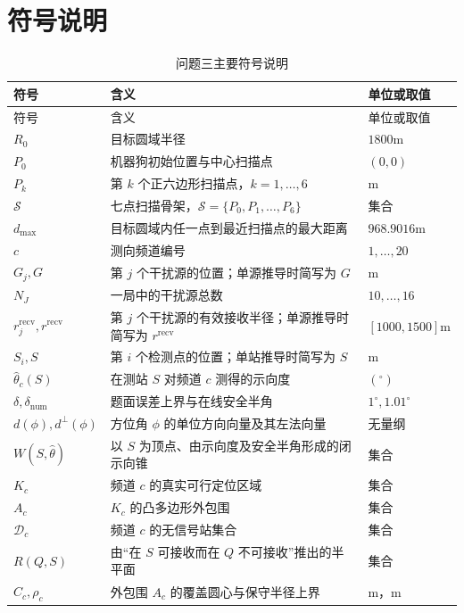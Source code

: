 \section{符号说明}

\begin{longtable}{@{}>{\small}p{}>{\small}p{}>{\small}p{}@{}}
\caption{问题三主要符号说明}
\label{tab:q3_symbols}\\
\toprule
符号 & 含义 & 单位或取值 \\
\midrule
\endfirsthead
\toprule
符号 & 含义 & 单位或取值 \\
\midrule
\endhead
$R_0$ & 目标圆域半径 & $1800\mathrm{m}$ \\
$P_0$ & 机器狗初始位置与中心扫描点 & $(0,0)$ \\
$P_k$ & 第 $k$ 个正六边形扫描点，$k=1,\ldots,6$ & m \\
$\mathcal S$ & 七点扫描骨架，$\mathcal S=\{P_0,P_1,\ldots,P_6\}$ & 集合 \\
$d_{\max}$ & 目标圆域内任一点到最近扫描点的最大距离 & $968.9016\mathrm{m}$ \\
$c$ & 测向频道编号 & $1,\ldots,20$ \\
$G_j,G$ & 第 $j$ 个干扰源的位置；单源推导时简写为 $G$ & m \\
$N_J$ & 一局中的干扰源总数 & $10,\ldots,16$ \\
$r_j^{\mathrm{recv}},r^{\mathrm{recv}}$ & 第 $j$ 个干扰源的有效接收半径；单源推导时简写为 $r^{\mathrm{recv}}$ & $[1000,1500]\mathrm{m}$ \\
$S_i,S$ & 第 $i$ 个检测点的位置；单站推导时简写为 $S$ & m \\
$\hat\theta_c(S)$ & 在测站 $S$ 对频道 $c$ 测得的示向度 & $(^\circ)$ \\
$\delta,\delta_{\mathrm{num}}$ & 题面误差上界与在线安全半角 & $1^\circ,1.01^\circ$ \\
$d(\phi),d^{\perp}(\phi)$ & 方位角 $\phi$ 的单位方向向量及其左法向量 & 无量纲 \\
$W(S,\hat\theta)$ & 以 $S$ 为顶点、由示向度及安全半角形成的闭示向锥 & 集合 \\
$K_c$ & 频道 $c$ 的真实可行定位区域 & 集合 \\
$A_c$ & $K_c$ 的凸多边形外包围 & 集合 \\
$\mathcal D_c$ & 频道 $c$ 的无信号站集合 & 集合 \\
$R(Q,S)$ & 由“在 $S$ 可接收而在 $Q$ 不可接收”推出的半平面 & 集合 \\
$C_c,\rho_c$ & 外包围 $A_c$ 的覆盖圆心与保守半径上界 & m，m \\

\end{longtable}
